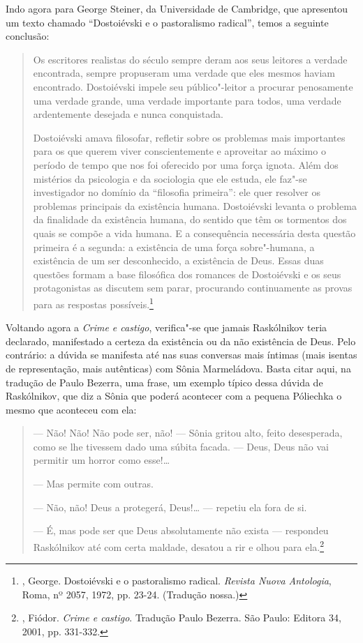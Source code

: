 Indo agora para George Steiner, da Universidade de Cambridge, que
apresentou um texto chamado ``Dostoiévski e o pastoralismo radical'',
temos a seguinte conclusão:

\begin{quotation}
Os escritores realistas do século  sempre deram aos seus leitores a
verdade encontrada, sempre propuseram uma verdade que eles mesmos haviam
encontrado. Dostoiévski impele seu público"-leitor a procurar penosamente
uma verdade grande, uma verdade importante para todos, uma verdade
ardentemente desejada e nunca conquistada.

Dostoiévski amava filosofar, refletir sobre os problemas mais
importantes para os que querem viver conscientemente e aproveitar ao
máximo o período de tempo que nos foi oferecido por uma força ignota.
Além dos mistérios da psicologia e da sociologia que ele estuda, ele
faz"-se investigador no domínio da ``filosofia primeira'': ele quer
resolver os problemas principais da existência humana. Dostoiévski
levanta o problema da finalidade da existência humana, do sentido que
têm os tormentos dos quais se compõe a vida humana. E a consequência
necessária desta questão primeira é a segunda: a existência de uma força
sobre"-humana, a existência de um ser desconhecido, a existência de Deus.
Essas duas questões formam a base filosófica dos romances de Dostoiévski
e os seus protagonistas as discutem sem parar, procurando continuamente
as provas para as respostas possíveis.\footnote{, George.
Dostoiévski e o pastoralismo radical. \emph{Revista Nuova Antologia}, Roma, nº 2057, 1972, pp. 23-24. (Tradução nossa.)}
\end{quotation}

Voltando agora a \emph{Crime e castigo}, verifica"-se que jamais
Raskólnikov teria declarado, manifestado a certeza da existência ou da
não existência de Deus. Pelo contrário: a dúvida se manifesta até nas
suas conversas mais íntimas (mais isentas de representação, mais
autênticas) com Sônia Marmeládova. Basta citar aqui, na tradução de
Paulo Bezerra, uma frase, um exemplo típico dessa dúvida de
Raskólnikov, que diz a Sônia que poderá acontecer com a pequena Póliechka o
mesmo que aconteceu com ela:

\begin{quotation}
--- Não! Não! Não pode ser, não! --- Sônia gritou alto, feito desesperada,
como se lhe tivessem dado uma súbita facada. --- Deus, Deus não vai
permitir um horror como esse!\ldots{}

--- Mas permite com outras.

--- Não, não! Deus a protegerá, Deus!\ldots{} --- repetiu ela fora de si.

--- É, mas pode ser que Deus absolutamente não exista --- respondeu
Raskólnikov até com certa maldade, desatou a rir e olhou para
ela.\footnote{, Fiódor. \emph{Crime e castigo}. Tradução
Paulo Bezerra. São Paulo: Editora 34, 2001, pp. 331-332.}
\end{quotation}

